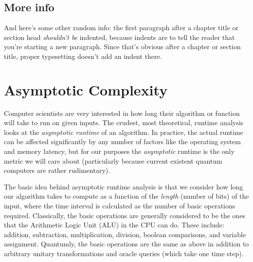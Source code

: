 \documentclass[12pt,twoside]{reedthesis}
\begin{document}
\section{More info}
And here's some other random info: the first paragraph after a chapter title or section head \emph{shouldn't be} indented, because indents are to tell the reader that you're starting a new paragraph. Since that's obvious after a chapter or section title, proper typesetting doesn't add an indent there. 


    \appendix
    	\chapter{Asymptotic Complexity}
    	Computer scientists are very interested in how long their algorithm or function will take to run on given inputs. The crudest, most theoretical, runtime analysis looks at the \textit{asymptotic runtime} of an algorithm. In practice, the actual runtime can be affected significantly by any number of factors like the operating system and memory  latency, but for our purposes the 
\textit{asymptotic} runtime is the only metric we will care about (particularly because current existent quantum computers are rather rudimentary).

The basic idea behind asymptotic runtime analysis is that we consider how long our algorithm takes to compute as a function of the \textit{length} (number of bits) of the input, where the time interval is calculated as the number of basic operations required. Classically, the basic operations are generally considered to be the ones that the Arithmetic Logic Unit (ALU) in the CPU can do. These include: addition, subtraction, multiplication, division, boolean comparisons, and variable assignment. Quantumly, the basic operations are the same as above in addition to arbitrary unitary transformations and oracle queries (which take one time step). 
\end{document}
